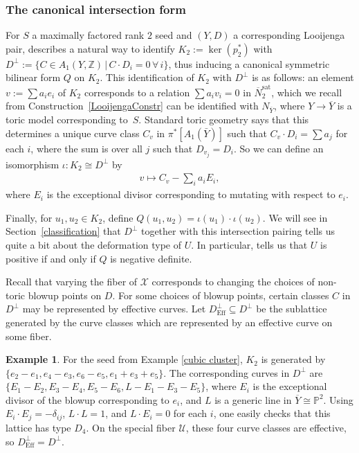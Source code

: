 \documentclass[10pt,a4paper]{amsart}
\numberwithin{equation}{section}
\numberwithin{figure}{section}
\numberwithin{table}{section}
\DeclareMathOperator{\Eff}{Eff}
\DeclareMathOperator{\sat}{sat}
\let\?=\overline
\let\bb=\mathbb
\let\rar=\rightarrow
\let\s=\mathcal
\theoremstyle{definition}
\newtheorem{eg}[thm]{Example}
\begin{document}
\subsubsection{The canonical intersection form}\label{canonical intersection}

For $S$ a maximally factored rank $2$ seed and $(Y,D)$ a corresponding Looijenga pair, \cite{GHK3} describes a natural way to identify $K_2:=\ker(p_2^*)$ with $D^{\perp}:=\{C\in A_1(Y,\bb{Z})\,|\,C\cdot D_i =0 \,\forall\,i\}$, thus inducing a canonical symmetric bilinear form $Q$ on $K_2$. This identification of $K_2$ with $D^{\perp}$ is as follows: an element $v:=\sum a_i e_i$ of $K_2$ corresponds to a relation $\sum a_{i} v_i = 0$ in $\?{N}_2^{\sat}$, which we recall from Construction~\ref{LooijengaConstr} can be identified with $N_{\?{Y}}$, where $Y\rar \?{Y}$ is a toric model corresponding to~$S$. Standard toric geometry says that this determines a unique curve class $C_v$ in $\pi^{*}[A_1(\bar{Y})]$ such that $C_v\cdot D_i = \sum a_{j}$ for each $i$, where the sum is over all $j$ such that $D_{v_j}=D_i$. So we can define an isomorphism $\iota\colon K_2 \cong D^{\perp}$ by
\begin{gather*}
	v\mapsto C_v - \sum_i a_{i} E_{i},
\end{gather*}
where $E_i$ is the exceptional divisor corresponding to mutating with respect to $e_i$.

Finally, for $u_1,u_2 \in K_2$, define $Q(u_1,u_2) = \iota(u_1) \cdot \iota(u_2)$. We will see in Section~\ref{classification} that $D^{\perp}$ together with this intersection pairing tells us quite a bit about the deformation type of $U$. In particular, \cite{GHK3} tells us that $U$ is positive if and only if $Q$ is negative definite.

Recall that varying the fiber of $\s{X}$ corresponds to changing the choices of non-toric blowup points on $D$. For some choices of blowup points, certain classes $C$ in $D^{\perp}$ may be represented by effective curves. Let $D^{\perp}_{\Eff} \subseteq D^{\perp}$ be the sublattice generated by the curve classes which are represented by an effective curve on some fiber.

\begin{eg}For the seed from Example \ref{cubic cluster}, $K_2$ is generated by $\{e_2-e_1,e_4-e_3,e_6-e_5,e_1+e_3+e_5\}$. The corresponding curves in $D^{\perp}$ are $\{E_1-E_2,E_3-E_4,E_5-E_6,L-E_1-E_3-E_5\}$, where $E_i$ is the exceptional divisor of the blowup corresponding to $e_i$, and $L$ is a generic line in $\?{Y}\cong \bb{P}^2$. Using $E_i\cdot E_j = -\delta_{ij}$, $L\cdot L=1$, and $L\cdot E_i=0$ for each $i$, one easily checks that this lattice has type $D_4$. On the special fiber $\s{U}$, these four curve classes are effective, so $D^{\perp}_{\Eff} = D^{\perp}$.
\end{eg}
\end{document}
